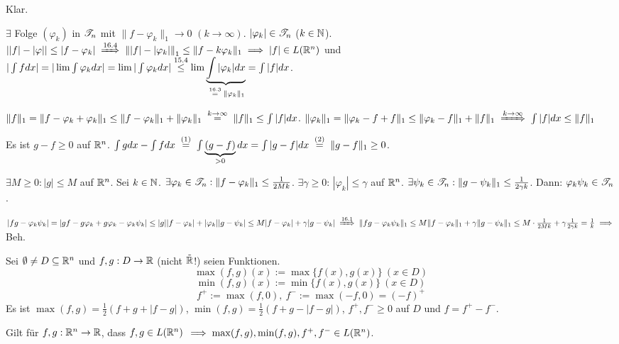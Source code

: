\documentclass[a4paper,twoside,DIV15,BCOR12mm]{scrbook}
\begin{document}
\begin{beweise}
\item Klar.
\item $\exists$ Folge $(\varphi_k)$ in $\mathscr{T}_n$ mit $\|f-\varphi_k\|_1 \to 0$ $(k\to\infty)$. $|\varphi_k| \in \mathscr{T}_n$ ($k\in\mathbb{N}$). $\left| |f| - |\varphi| \right|\le|f-\varphi_k| \folgtnach{16.4} \left\| |f|-|\varphi_k| \right\|_1 \le \|f-k\varphi_k\|_1 \folgt |f| \in L(\MdR^n)$ und $| \int fdx | = |\lim \int \varphi_k dx| = \lim | \int \varphi_k dx | \stackrel{\text{15.4}}\le \lim \underbrace{\int |\varphi_{k}| dx}_{\gleichnach{16.3} \|\varphi_k\|_1} = \int |f| dx$.

$\|f\|_1 = \|f - \varphi _k + \varphi_k\|_1 \le \|f-\varphi_k\|_1 + \|\varphi_k\|_1 \gleichwegen{k\to\infty} \|f\|_1 \le \int |f| dx$. $\|\varphi_k\|_1 = \|\varphi_k- f + f\|_1 \le \|\varphi_k - f\|_1 + \|f\|_1 \folgtwegen{k\to\infty} \int |f| dx \le \|f\|_1$
\item Es ist $g-f \ge 0$ auf $\mathbb{R}^n$. $\int gdx - \int fdx \gleichnach{(1)} \int \underbrace{(g-f)}_{>0} dx = \int |g-f| dx \gleichnach{(2)} \|g-f\|_1 \ge 0$.

\item $\exists M \ge 0: |g|\le M$ auf $\mathbb{R}^n$. Sei $k\in\mathbb{N}$. $\exists \varphi_k \in \mathscr{T}_n: \|f-\varphi_k\|_1\le \frac{1}{2Mk}$. $\exists \gamma \ge 0$: $|\varphi_k| \le \gamma $ auf $\mathbb{R}^n$. $\exists \psi _k \in \mathscr{T}_n: \|g-\psi_k\|_1 \le \frac{1}{2\gamma k}$. Dann: $\varphi_k\psi_k \in \mathscr{T}_n$.

$|fg -\varphi_k \psi_k| = |gf - g\varphi_k + g \varphi_k - \varphi_k\psi_k| \le |g| |f-\varphi_k| + |\varphi_k||g -\psi_k| \le M|f-\varphi_k| + \gamma|g - \psi_k| \folgtnach{16.1} \|fg-\varphi_k\psi_k\|_1 \le M \|f-\varphi_k\|_1 + \gamma \| g-\psi_k\|_1 \le M\cdot \frac{1}{2Mk} + \gamma \frac{1}{2\gamma k} = \frac{1}{k} \folgt$ Beh.
\end{beweise}

\begin{definition}
Sei $\emptyset \ne D \subseteq \mathbb{R}^n$ und $f,g: D\to\mathbb{R}$ (nicht $\tilde {\mathbb{R}}$!) seien Funktionen.
$$\max(f,g) (x) := \max \{f(x),g(x)\} \ (x\in D) $$
$$\min(f,g) (x) := \min \{f(x),g(x)\} \ (x\in D) $$
$$f^+ := \max(f,0),\ f^- := \max(-f,0) = (-f)^+$$
Es ist $\max(f,g) = \frac{1}{2}(f+g+|f-g|)$, $\min(f,g) = \frac{1}{2}(f+g-|f-g|)$, $f^+,f^- \ge 0$ auf $D$ und $f=f^+-f^-$.
\end{definition}

\begin{folgerung}
Gilt für $f,g: \mathbb{R}^n\to \mathbb{R}$, dass $f,g\in L(\mathbb{R}^n)$ $\implies \max(f,g), \min(f,g), f^+, f^- \in L(\mathbb{R}^n)$.
\end{folgerung}
\end{document}
